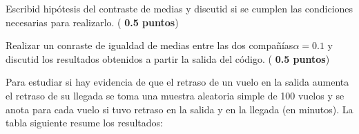 \documentclass[10pt]{article}
\newcounter{problemes}
\newcounter{punts} \def\thepunts{\arabic{punts}}
\def\probl{\addtocounter{problemes}{1} \setcounter{punts}{0}
\medskip\noindent{\bf \theproblemes) }}
\def\punt{\addtocounter{punts}{1} \smallskip{\emph{\thepunts) }}}
\begin{document}
\punt  Escribid hipótesis del contraste de medias y discutid si se cumplen las condiciones necesarias para realizarlo. (\textbf{ 0.5 puntos})

\punt Realizar un conraste de igualdad de medias entre las dos compañías$\alpha = 0.1$ y discutid los resultados obtenidos a partir la salida del  código. (\textbf{ 0.5 puntos})




\newpage

\probl  Para estudiar si hay evidencia de que el retraso de un vuelo en la salida aumenta el retraso de su llegada se toma una muestra aleatoria simple de 100 vuelos y se anota para cada vuelo si tuvo retraso en la salida y en la llegada (en minutos).
La tabla siguiente resume los resultados:
\end{document}

